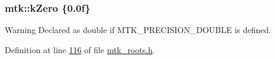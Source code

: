 \hypertarget{group__c01-roots_ga59a451a5fae30d59649bcda274fea271}{
\subsubsection[{k\+Zero}]{\setlength{\rightskip}{0pt plus 5cm}mtk\+::k\+Zero \{0.\+0f\}}}\label{group__c01-roots_ga59a451a5fae30d59649bcda274fea271}
\begin{DoxyWarning}{Warning}
Declared as double if M\+T\+K\+\_\+\+P\+R\+E\+C\+I\+S\+I\+O\+N\+\_\+\+D\+O\+U\+B\+L\+E is defined. 
\end{DoxyWarning}


Definition at line \hyperlink{mtk__roots_8h_source_l00116}{116} of file \hyperlink{mtk__roots_8h_source}{mtk\+\_\+roots.\+h}.

